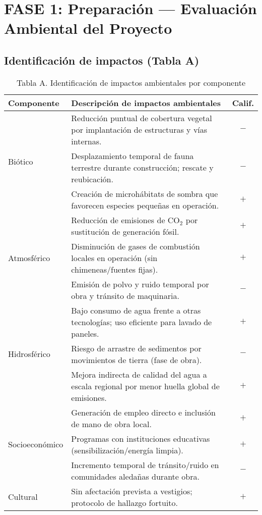 \section{FASE 1: Preparación — Evaluación Ambiental del Proyecto}

\subsection{Identificación de impactos (Tabla A)}

\begin{table}[H]
\centering
\caption{Tabla A. Identificación de impactos ambientales por componente}
\begin{tabular}{|l|p{11cm}|c|}
\hline
\textbf{Componente} & \textbf{Descripción de impactos ambientales} & \textbf{Calif.}\\
\hline
\multirow{3}{*}{Biótico} 
& Reducción puntual de cobertura vegetal por implantación de estructuras y vías internas. & $-$\\
& Desplazamiento temporal de fauna terrestre durante construcción; rescate y reubicación. & $-$\\
& Creación de microhábitats de sombra que favorecen especies pequeñas en operación. & $+$\\
\hline
\multirow{3}{*}{Atmosférico} 
& Reducción de emisiones de CO$_2$ por sustitución de generación fósil. & $+$\\
& Disminución de gases de combustión locales en operación (sin chimeneas/fuentes fijas). & $+$\\
& Emisión de polvo y ruido temporal por obra y tránsito de maquinaria. & $-$\\
\hline
\multirow{3}{*}{Hidrosférico} 
& Bajo consumo de agua frente a otras tecnologías; uso eficiente para lavado de paneles. & $+$\\
& Riesgo de arrastre de sedimentos por movimientos de tierra (fase de obra). & $-$\\
& Mejora indirecta de calidad del agua a escala regional por menor huella global de emisiones. & $+$\\
\hline
\multirow{3}{*}{Socioeconómico} 
& Generación de empleo directo e inclusión de mano de obra local. & $+$\\
& Programas con instituciones educativas (sensibilización/energía limpia). & $+$\\
& Incremento temporal de tránsito/ruido en comunidades aledañas durante obra. & $-$\\
\hline
\multirow{3}{*}{Cultural} 
& Sin afectación prevista a vestigios; protocolo de hallazgo fortuito. & $+$\\

\end{tabular}
\end{table}
